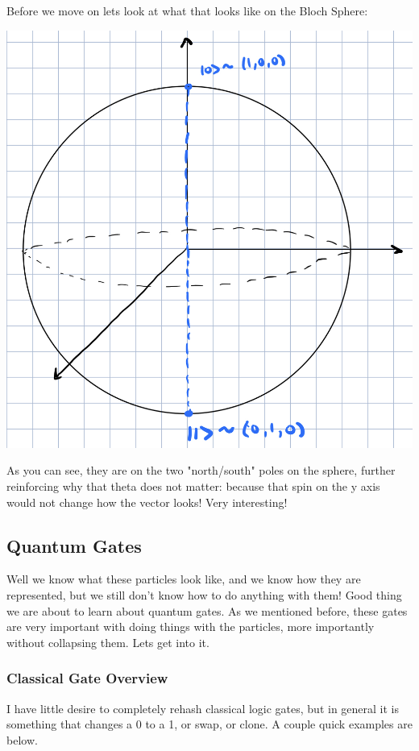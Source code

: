 \documentclass[12pt]{article}
\theoremstyle{plain}
\theoremstyle{nonumberplain}
\theoremstyle{plain}
\theoremstyle{nonumberplain}
\newcommand\1{{\bf 1}}
\newcommand{\<}{\left\langle}
\renewcommand{\>}{\right\rangle}
\begin{document}
Before we move on lets look at what that looks like on the Bloch Sphere:
 \begin{center}
 \includegraphics[scale=.3]{0and1}
 \end{center}
 As you can see, they are on the two "north/south" poles on the sphere, further reinforcing why that theta does not matter: because that spin on the y axis would not change how the vector looks! Very interesting!

\pagebreak

\subsection{Quantum Gates}
Well we know what these particles look like, and we know how they are represented, but we still don't know how to do anything with them!  Good thing we are about to learn about quantum gates.  As we mentioned before, these gates are very important with doing things with the particles, more importantly without collapsing them.  Lets get into it.

\subsubsection{Classical Gate Overview}
I have little desire to completely rehash classical logic gates, but in general it is something that changes a 0 to a 1, or swap, or clone. A couple quick examples are below.
\end{document}
